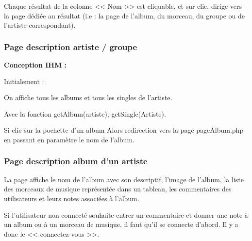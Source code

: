 
			\begin{paragraphe}
				Chaque résultat de la colonne << Nom >> est cliquable, et sur clic, dirige vers la page dédiée au résultat (i.e : la page de l'album, du morceau, du groupe ou de l'artiste correspondant).
			\end{paragraphe}

		\subsubsection{Page description artiste / groupe}

			\begin{paragraphe}
				\textbf{Conception IHM :}
			\end{paragraphe}

			\begin{paragraphe}
				Initialement :\par
				On affiche tous les albums et tous les singles de l'artiste.\par
				Avec la fonction getAlbum(artiste), getSingle(Artiste).
			\end{paragraphe}

			\begin{paragraphe}
				Si clic sur la pochette d'un album
				Alors redirection vers la page pageAlbum.php en passant en paramètre le nom de l'album.
			\end{paragraphe}


		\subsubsection{Page description album d'un artiste}

			\begin{paragraphe}
				La page affiche le nom de l'album avec son descriptif, l'image de l'album, la liste des morceaux de musique représentée dans un tableau, les commentaires des utilisateurs et leurs notes associées à l'album. \par
				Si l'utilisateur non connecté souhaite entrer un commentaire et donner une note à un album ou à un morceau de musique, il faut qu'il se connecte d'abord. Il y a donc le << connectez-vous >>.
			\end{paragraphe}

